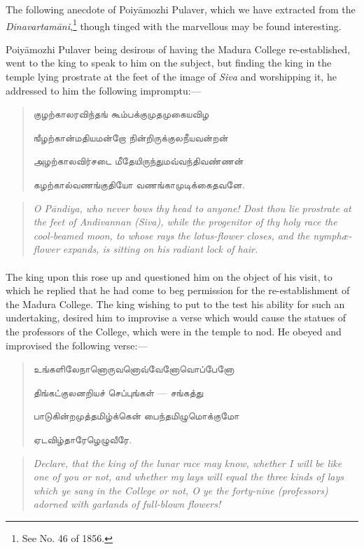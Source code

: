\documentclass{article}
\newcommand{\TamilText}[1]{\texttamil{#1}}
\newcommand{\tam}[1]{\TamilText{#1}}
\begin{document}
The following anecdote of Poiy\={a}mozhi Pulaver, which we have extracted from the \emph{Dinavartam\={a}ni},\footnote{See No. 46 of 1856.} though tinged with the marvellous may be found interesting.

Poiy\={a}mozhi Pulaver being desirous of having the Madura College re-established, went to the king to speak to him on the subject, but finding the king in the temple lying prostrate at the feet of the image of \emph{Siva} and worshipping it, he addressed to him the following impromptu:---
\begin{quotation}\small
\tam{குழற்காலரவிந்தங்‌ கூம்பக்குமுதமுகையவிழ}

\tam{ஙீழற்கான்மதியமன்றோ நின்றிருக்குலநீயவன்றன்‌}

\tam{அழற்காலவிர்சடை மீதேயிருந்துமவ்வந்திவண்ணன்‌}

\tam{கழற்கால்வணங்குதியோ வணங்காமுடிக்கைதவனே}.
\end{quotation}
\begin{quotation}\small
\emph{O P\={a}ndiya, who never bows thy head to anyone! Dost thou lie prostrate at the feet of Andivannan (Siva), while the progenitor of thy holy race the cool-beamed moon, to whose rays the lotus-flower closes, and the nymphæ-flower expands, is sitting on his radiant lock of hair.}
\end{quotation}
\paragraph{}
The king upon this rose up and questioned him on the object of his visit, to which he replied that he had come to beg permission for the re-establishment of the Madura College. The king wishing to put to the test his ability for such an undertaking, desired him to improvise a verse which would cause the statues of the professors of the College, which were in the temple to nod. He obeyed and improvised the following verse:---
\begin{quotation}\small
\tam{உங்களிலேநானொருவனொவ்வேனோவொப்பேனோ}

\tam{திங்கட்குலனறியச்‌ செப்புங்கள்‌} --- \tam{சங்கத்து}

\tam{பாடுகின்றமுத்தமிழ்க்கென்‌ பைந்தமிழுமொக்குமோ}

\tam{ஏடவிழ்தாரேழெழுவீரே}.
\end{quotation}
\begin{quotation}\small
\emph{Declare, that the king of the lunar race may know, whether I will be like one of you or not, and whether my lays will equal the three kinds of lays which ye sang in the College or not, O ye the forty-nine (professors) adorned with garlands of full-blown flowers!}
\end{quotation}
\end{document}
